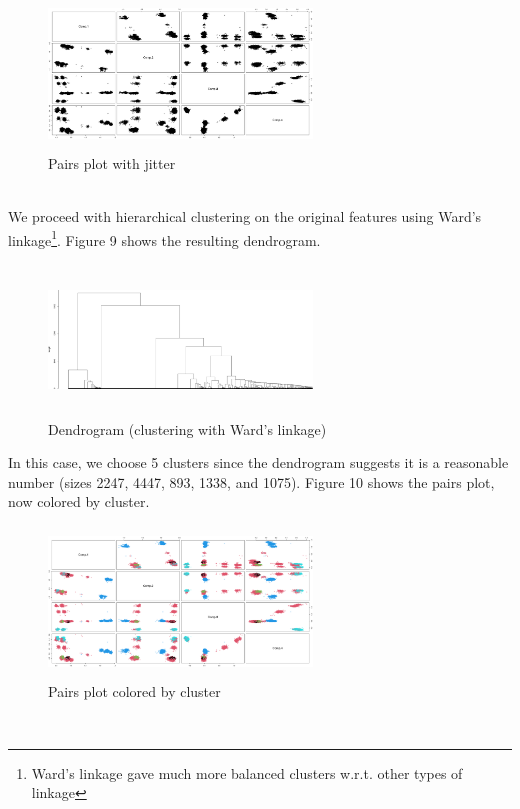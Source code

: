 \documentclass[twoside,twocolumn]{article}
\begin{document}
	\begin{figure}[h]
		\caption{Pairs plot with jitter}
		\label{pairsjitter}
		\centering
		\includegraphics[width=70mm, height=40mm]{pairsjitter.png}
	\end{figure}\\
	We proceed with hierarchical clustering on the original features using Ward's linkage\footnote{Ward's linkage gave much more balanced clusters w.r.t. other types of linkage}. Figure 9 shows the resulting dendrogram.
	\begin{figure}[h]
		\caption{Dendrogram (clustering with Ward's linkage)}
		\label{dendrogram}
		\centering
		\includegraphics[width=70mm, height=40mm]{dendrogram.png}
	\end{figure}
	In this case, we choose 5 clusters since the dendrogram suggests it is a reasonable number (sizes 2247, 4447, 893, 1338, and 1075). Figure 10 shows the pairs plot, now colored by cluster. 
	\begin{figure}[h]
		\caption{Pairs plot colored by cluster}
		\label{pairscolored}
		\centering
		\includegraphics[width=70mm, height=40mm]{pairs2.png}
	\end{figure}\\
\end{document}
